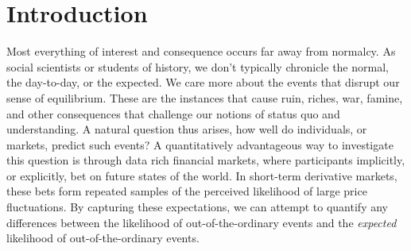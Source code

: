\documentclass[11pt,a4paper,oldfontcommands]{memoir}
\begin{document}
{\begin{abstract}
\end{abstract}

\clearpage


\section{Introduction}

Most everything of interest and consequence occurs far away from normalcy. As social scientists or students of history, we don't typically chronicle the normal, the day-to-day, or the expected. We care more about the events that disrupt our sense of equilibrium. These are the instances that cause ruin, riches, war, famine, and other consequences that challenge our notions of status quo and understanding. A natural question thus arises, how well do individuals, or markets, predict such events? A quantitatively advantageous way to investigate this question is through data rich financial markets, where participants implicitly, or explicitly, bet on future states of the world. In short-term derivative markets, these bets form repeated samples of the perceived likelihood of large price fluctuations. By capturing these expectations, we can attempt to quantify any differences between the likelihood of out-of-the-ordinary events and the \textit{expected} likelihood of out-of-the-ordinary events. 

}
\end{document}
